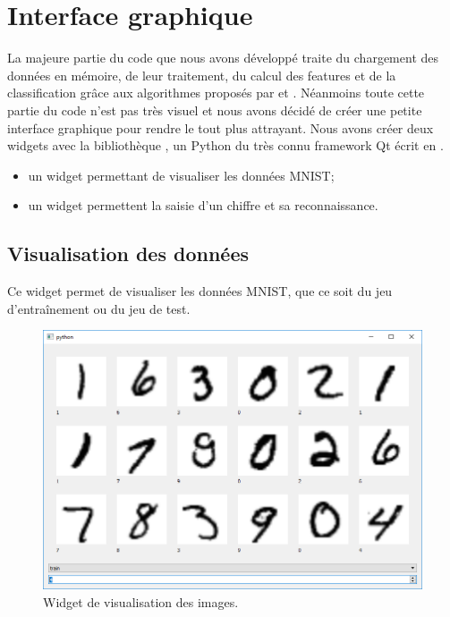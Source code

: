 
\chapter{Interface graphique}

La majeure partie du code que nous avons développé traite du chargement des données 
en mémoire, de leur traitement, du calcul des features et de la classification grâce 
aux algorithmes proposés par  et .
Néanmoins toute cette partie du code n'est pas très visuel et nous avons 
décidé de créer une petite interface graphique pour rendre le tout plus attrayant.
Nous avons créer deux widgets avec la bibliothèque , un 
Python du très connu framework Qt écrit en \Cpp.
\begin{itemize}
  \item un widget permettant de visualiser les données MNIST;
  \item un widget permettent la saisie d'un chiffre et sa reconnaissance.
\end{itemize}


\section{Visualisation des données}

Ce widget permet de visualiser les données MNIST, que ce soit du jeu d'entraînement 
ou du jeu de test.

\begin{figure}[h]
  \centering
  \includegraphics[scale=0.66]{assets/dataset-widget}
  \caption{Widget de visualisation des images.}
\end{figure}

